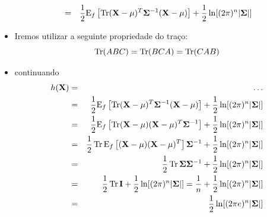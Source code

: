 \begin{frame}[allowframebreaks]
\begin{itemize}
\begin{eqnarray}
		&=& \frac{1}{2} \mathrm{E}_f \left[ \operatorname{Tr} (\mathbf{X} - \mathbf{\mu})^T \mathbf{\Sigma}^{-1} (\mathbf{X} - \mathbf{\mu})  \right] + \frac{1}{2} \ln [(2\pi)^n \vert \mathbf{\Sigma} \vert]
	\end{eqnarray} 
  \item Iremos utilizar a seguinte propriedade do traço:
	\begin{equation}
	\operatorname{Tr} (ABC) = \operatorname{Tr}(BCA) = \operatorname{Tr}(CAB)
	\end{equation} 
  \item continuando
	\begin{eqnarray}
        h(\mathbf{X}) &=& \ldots \nonumber \\
		&=& \frac{1}{2} \mathrm{E}_f \left[ \operatorname{Tr} (\mathbf{X} - \mathbf{\mu})^T \mathbf{\Sigma}^{-1} (\mathbf{X} - \mathbf{\mu})  \right] + \frac{1}{2} \ln [(2\pi)^n \vert \mathbf{\Sigma} \vert] \\ 
		&=& \frac{1}{2} \mathrm{E}_f \left[ \operatorname{Tr} (\mathbf{X} - \mathbf{\mu}) (\mathbf{X} - \mathbf{\mu})^T \mathbf{\Sigma}^{-1}  \right] + \frac{1}{2} \ln [(2\pi)^n \vert \mathbf{\Sigma} \vert] \\
		&=& \frac{1}{2} \operatorname{Tr} \mathrm{E}_f \left[ (\mathbf{X} - \mathbf{\mu}) (\mathbf{X} - \mathbf{\mu})^T \right] \mathbf{\Sigma}^{-1} + \frac{1}{2} \ln [(2\pi)^n \vert \mathbf{\Sigma} \vert] \\
		&=& \frac{1}{2} \operatorname{Tr} \mathbf{\Sigma} \mathbf{\Sigma}^{-1} + \frac{1}{2} \ln [(2\pi)^n \vert \mathbf{\Sigma} \vert] \\
		&=& \frac{1}{2} \operatorname{Tr} \mathbf{I} + \frac{1}{2} \ln [(2\pi)^n \vert \mathbf{\Sigma} \vert] = \frac{1}{n} + \frac{1}{2} \ln [(2\pi)^n \vert \mathbf{\Sigma} \vert] \\
		&=& \frac{1}{2} \ln [(2\pi e)^n \vert \mathbf{\Sigma} \vert]
	\end{eqnarray}
  \end{itemize}

\end{frame}


